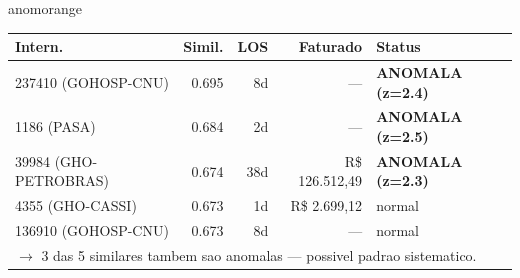 \documentclass[a4paper,10pt]{article}
\begin{document}
\begin{anomalycard}[Internacao 120486 | GHO-BRADESCO | ALTO (z=3.26)]{anomorange}
\begin{tabular}{l r r r l}\toprule\textbf{Intern.} & \textbf{Simil.} & \textbf{LOS} & \textbf{Faturado} & \textbf{Status} \\\midrule
237410 (GOHOSP-CNU) & 0.695 & 8d & --- & \textcolor{anomred}{\textbf{ANOMALA (z=2.4)}} \\
1186 (PASA) & 0.684 & 2d & --- & \textcolor{anomred}{\textbf{ANOMALA (z=2.5)}} \\
39984 (GHO-PETROBRAS) & 0.674 & 38d & R\$ 126.512,49 & \textcolor{anomred}{\textbf{ANOMALA (z=2.3)}} \\
4355 (GHO-CASSI) & 0.673 & 1d & R\$ 2.699,12 & \textcolor{jcubeblue}{normal} \\
136910 (GOHOSP-CNU) & 0.673 & 8d & --- & \textcolor{jcubeblue}{normal} \\
\multicolumn{5}{l}{\textcolor{anomred}{\small $\rightarrow$ 3 das 5 similares tambem sao anomalas --- possivel padrao sistematico.}} \\
\bottomrule\end{tabular}


\end{anomalycard}

\newpage
\end{document}
